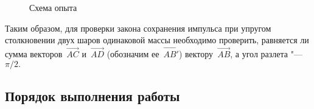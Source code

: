 \documentclass[a4paper, 12pt]{extarticle}
\begin{document}
\begin{figure}[h]
\begin{center}
\end{center}
\caption{Схема опыта \label{fig:m4-impulse-diagram}} %
\end{figure}

Таким образом, для проверки закона сохранения импульса при упругом столкновении двух шаров одинаковой массы необходимо проверить, равняется ли сумма векторов~$\vec{AC}$ и~$\vec{AD}$ (обозначим ее~$\vec{AB'}$) вектору~$\vec{AB}$, а угол разлета "--- $\pi/2.$





\subsection{Порядок выполнения работы}
\end{document}
